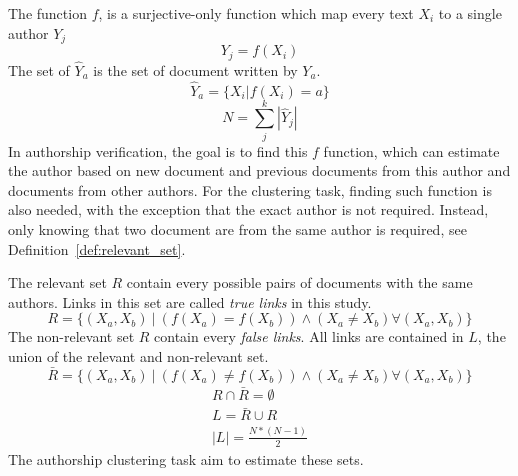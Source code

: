 \begin{definition}
  The function $f$, is a surjective-only function which map every text $X_i$ to a single author $Y_j$
  \begin{equation}
    Y_j = f(X_i)
  \end{equation}
  The set of $\hat{Y}_a$ is the set of document written by $Y_a$.
  \begin{equation}
    \hat{Y}_a = \{X_i | f(X_i) = a\}
  \end{equation}
  \begin{equation}
    N = \sum_{j}^k |\hat{Y}_j|
  \end{equation}
  In authorship verification, the goal is to find this $f$ function, which can estimate the author based on new document and previous documents from this author and documents from other authors.
  For the clustering task, finding such function is also needed, with the exception that the exact author is not required.
  Instead, only knowing that two document are from the same author is required, see Definition~\ref{def:relevant_set}.
\end{definition}

\begin{definition}
  The relevant set $R$ contain every possible pairs of documents with the same authors.
  Links in this set are called \textit{true links} in this study.
  \begin{equation}
    R = \{(X_a, X_b)\ |\ \left( f(X_a) = f(X_b) \right) \land \left(X_a \neq X_b \right) \forall (X_a, X_b)\}
  \end{equation}
  The non-relevant set $R$ contain every \textit{false links}.
  All links are contained in $L$, the union of the relevant and non-relevant set.
  \begin{equation}
    \bar{R} = \{(X_a, X_b)\ |\ \left( f(X_a) \neq f(X_b) \right) \land \left(X_a \neq X_b \right) \forall (X_a, X_b)\}
  \end{equation}
  \begin{gather}
    R \cap \bar{R} = \emptyset \\
    L = \bar{R} \cup R \\
    |L| = \frac{N * (N-1)}{2}
  \end{gather}
  The authorship clustering task aim to estimate these sets.
\end{definition}

